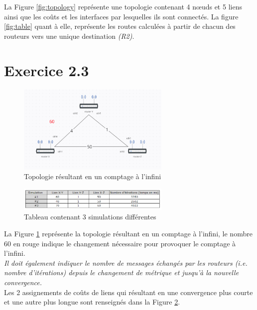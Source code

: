 \documentclass[11pt]{article}
\begin{document}
La Figure \ref{fig:topology} représente une topologie contenant 4 nœuds et 5 liens ainsi que les coûts et les interfaces par lesquelles ils sont connectés. La figure \ref{fig:table} quant à elle, représente les routes calculées à partir de chacun des routeurs vers une unique destination \textit{(R2)}.



\section{Exercice 2.3}
\begin{figure} [h!]
\centering
  \includegraphics[width=0.65\textwidth]{../documents/infinity-figure.png}
  \caption{Topologie résultant en un comptage à l'infini}
   \label{fig:inf-topo}
\end{figure}
\begin{figure} [h!]
\centering
  \includegraphics[width=0.65\textwidth]{../documents/infinity-table.png}
  \caption{Tableau contenant 3 simulations différentes}
   \label{fig:inf-table}
\end{figure}

La Figure \ref{fig:inf-topo} représente la topologie résultant en un comptage à l'infini, le nombre 60 en rouge indique le changement nécessaire pour provoquer le comptage à l'infini.\\

\textit{Il doit également indiquer le nombre de messages échangés par les routeurs (i.e. nombre d’itérations) depuis le changement de métrique et jusqu’à la nouvelle convergence.}\\

Les 2 assignements de coûts de liens qui résultant en une convergence plus courte et une autre plus longue sont renseignés dans la Figure \ref{fig:inf-table}.
\end{document}
